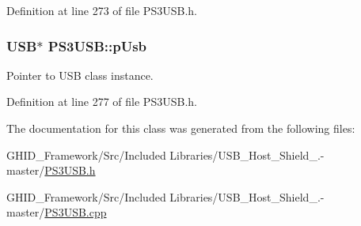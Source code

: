 \-Definition at line 273 of file \-P\-S3\-U\-S\-B.\-h.

\hypertarget{class_p_s3_u_s_b_aa1873f41ae0da7c4568cfb7517560c48}{
\subsubsection[{p\-Usb}]{\setlength{\rightskip}{0pt plus 5cm}\-U\-S\-B$\ast$ {\bf \-P\-S3\-U\-S\-B\-::p\-Usb}}}\label{class_p_s3_u_s_b_aa1873f41ae0da7c4568cfb7517560c48}
\-Pointer to \-U\-S\-B class instance. 

\-Definition at line 277 of file \-P\-S3\-U\-S\-B.\-h.



\-The documentation for this class was generated from the following files\-:\begin{DoxyCompactItemize}
\item 
\-G\-H\-I\-D\-\_\-\-Framework/\-Src/\-Included Libraries/\-U\-S\-B\-\_\-\-Host\-\_\-\-Shield\-\_.-\/master/\hyperlink{_p_s3_u_s_b_8h}{\-P\-S3\-U\-S\-B.\-h}\item 
\-G\-H\-I\-D\-\_\-\-Framework/\-Src/\-Included Libraries/\-U\-S\-B\-\_\-\-Host\-\_\-\-Shield\-\_.-\/master/\hyperlink{_p_s3_u_s_b_8cpp}{\-P\-S3\-U\-S\-B.\-cpp}\end{DoxyCompactItemize}
